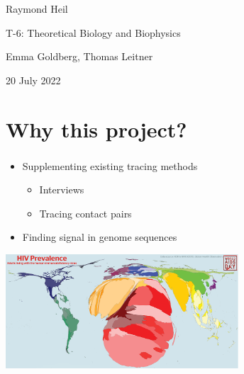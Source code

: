 \documentclass[aspectratio=169]{beamer}
\begin{document}
\begin{frame}

    \begin{center}

        \vfill

        Raymond Heil

        T-6: Theoretical Biology and Biophysics

        Emma Goldberg, Thomas Leitner

        \vfill

        \scriptsize{20 July 2022}

    \end{center}


\end{frame}

\section{Why this project?}

\begin{frame} \frametitle{\insertsection}

    \begin{itemize}
        \item Supplementing existing tracing methods
        \begin{itemize}
            \item Interviews
            \item Tracing contact pairs
        \end{itemize}
        \item Finding signal in genome sequences 
    \end{itemize}

    \leavevmode\hphantom{ } %

    \centering\includegraphics[width=0.65\textwidth]{images/hiv-prevalence-cartogram}


\end{frame}
\end{document}

